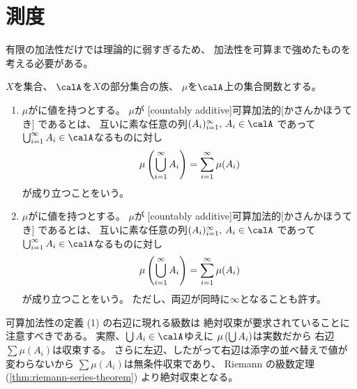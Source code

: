 \documentclass[report]{jlreq}
\begin{document}
%
\section{測度}

有限の加法性だけでは理論的に弱すぎるため、
加法性を可算まで強めたものを考える必要がある。

\begin{definition}[可算加法性]
    $X$を集合、
    $\calA$を$X$の部分集合の族、
    $\mu$を$\calA$上の集合関数とする。
    \begin{enumerate}
        \item $\mu$が\highlight{$(-\infty, +\infty)$}に値を持つとする。
            $\mu$が
            [countably additive]{可算加法的}[かさんかほうてき]
            であるとは、
            互いに素な任意の列$(A_i)_{i = 1}^\infty, \, A_i \in \calA$
            であって$\bigcup_{i = 1}^\infty A_i \in \calA$なるものに対し
            \begin{equation}
                \mu\left({\bigcup_{i = 1}^\infty A_i}\right)
                    = \sum_{i = 1}^\infty \mu(A_i)
            \end{equation}
            が成り立つことをいう。
        \item $\mu$が\highlight{$[0, +\infty]$}に値を持つとする。
            $\mu$が
            [countably additive]{可算加法的}[かさんかほうてき]
            であるとは、
            互いに素な任意の列$(A_i)_{i = 1}^\infty, \, A_i \in \calA$
            であって$\bigcup_{i = 1}^\infty A_i \in \calA$なるものに対し
            \begin{equation}
                \mu\left({\bigcup_{i = 1}^\infty A_i}\right)
                    = \sum_{i = 1}^\infty \mu(A_i)
            \end{equation}
            が成り立つことをいう。
            ただし、両辺が同時に$\infty$となることも許す。
    \end{enumerate}
\end{definition}

\begin{remark}
    可算加法性の定義 (1) の右辺に現れる級数は
    絶対収束が要求されていることに注意すべきである。
    実際、$\bigcup A_i \in \calA$ゆえに
    $\mu\left({\bigcup A_i}\right)$は実数だから
    右辺$\sum \mu(A_i)$は収束する。
    さらに左辺、したがって右辺は添字の並べ替えで値が変わらないから
    $\sum \mu(A_i)$は無条件収束であり、
    Riemann の級数定理
    (\cref{thm:riemann-series-theorem})
    より絶対収束となる。
\end{remark}
\end{document}
